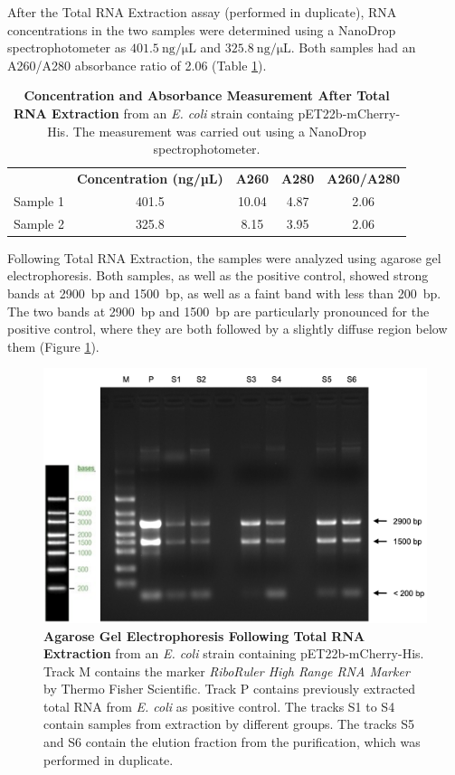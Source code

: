 \documentclass[a4paper,12pt]{article}
\begin{document}
After the Total RNA Extraction assay (performed in duplicate), RNA concentrations in the two samples were determined using a NanoDrop spectrophotometer as $\SI{401.5}{\nano\gram\per\micro\liter}$ and $\SI{325.8}{\nano\gram\per\micro\liter}$. Both samples had an A260/A280 absorbance ratio of 2.06 (Table \ref{tab:rna1}). 

\begin{table}[h!]
\centering
\caption{\textbf{Concentration and Absorbance Measurement After Total RNA Extraction} from an \emph{E. coli} strain containg pET22b-mCherry-His. The measurement was carried out using a NanoDrop spectrophotometer. }
\begin{tabular}{lcccc}
    & \textbf{Concentration (ng/µL)} & \textbf{A260} & \textbf{A280} & \textbf{A260/A280} \\
    Sample 1 & 401.5 & 10.04 & 4.87 & 2.06 \\
    Sample 2 & 325.8 & 8.15 & 3.95 & 2.06 
\end{tabular}
\label{tab:rna1}
\end{table}

Following Total RNA Extraction, the samples were analyzed using agarose gel electrophoresis. Both samples, as well as the positive control, showed strong bands at 2900~bp and 1500~bp, as well as a faint band with less than 200~bp. The two bands at 2900~bp and 1500~bp are particularly pronounced for the positive control, where they are both followed by a slightly diffuse region below them (Figure \ref{fig:rna1}).

\begin{figure}[h!]
    \centering
    \includegraphics[width=\textwidth]{images/rna_pre_pcr.png}
    \caption{\textbf{Agarose Gel Electrophoresis Following Total RNA Extraction} from an \emph{E. coli} strain containing pET22b-mCherry-His. Track M contains the marker \emph{RiboRuler High Range RNA Marker} by Thermo Fisher Scientific. Track P contains previously extracted total RNA from \emph{E. coli} as positive control. The tracks S1 to S4 contain samples from extraction by different groups. The tracks S5 and S6 contain the elution fraction from the purification, which was performed in duplicate. }
    \label{fig:rna1}
\end{figure}
\end{document}
